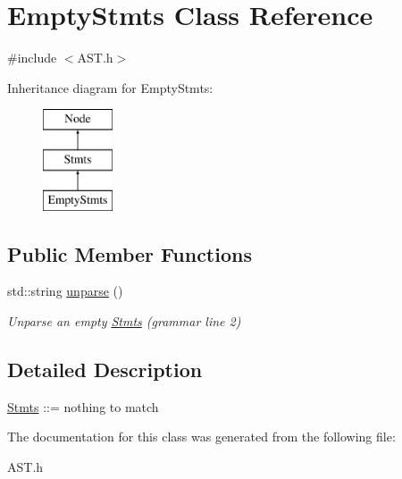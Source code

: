 \hypertarget{classEmptyStmts}{\section{Empty\-Stmts Class Reference}
\label{classEmptyStmts}
}


{\ttfamily \#include $<$A\-S\-T.\-h$>$}

Inheritance diagram for Empty\-Stmts\-:\begin{figure}[H]
\begin{center}
\leavevmode
\includegraphics[height=3.000000cm]{classEmptyStmts}
\end{center}
\end{figure}
\subsection*{Public Member Functions}
\begin{DoxyCompactItemize}
\item 
\hypertarget{classEmptyStmts_a127064ef5c59227fc8452b31c65eb905}{std\-::string \hyperlink{classEmptyStmts_a127064ef5c59227fc8452b31c65eb905}{unparse} ()}\label{classEmptyStmts_a127064ef5c59227fc8452b31c65eb905}

\begin{DoxyCompactList}\small\item\em Unparse an empty \hyperlink{classStmts}{Stmts} (grammar line 2) \end{DoxyCompactList}\end{DoxyCompactItemize}


\subsection{Detailed Description}
\hyperlink{classStmts}{Stmts} \-:\-:= nothing to match 

The documentation for this class was generated from the following file\-:\begin{DoxyCompactItemize}
\item 
A\-S\-T.\-h\end{DoxyCompactItemize}
